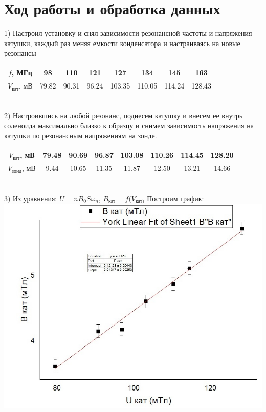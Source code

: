 \documentclass[%
reprint,
amsmath,amssymb,
aps,
]{revtex4-2}
\begin{document}
\section*{Ход работы и обработка данных}
1) Настроил установку и снял зависимости резонансной частоты и напряжения катушки, каждый раз меняя емкости конденсатора и настраиваясь на новые резонансы
\begin{table}[h]
\begin{tabular}{|c|c|c|c|c|c|c|c|}
\hline
$f$, МГц & 98 & 110 & 121 & 127 & 134 & 145 & 163 \\ \hline
$V_{\text{кат}}$, мВ & 79.82 & 90.31 & 96.24 & 103.35 & 110.05 & 114.24 & 128.43 \\ \hline
\end{tabular}
\centering
\end{table}\\
2) Настроившись на любой резонанс, поднесем катушку и внесем ее внутрь соленоида максимально близко к образцу и снимем зависимость напряжения на катушки по резонансным напряжениям на зонде.
\begin{table}[h]
\begin{tabular}{|c|c|c|c|c|c|c|c|}
$V_{\text{кат}}$, мВ & 79.48 & 90.69 & 96.87 & 103.08 & 110.26 & 114.45 & 128.20 \\ \hline
$V_{\text{зонд}}$, мВ & 9.44 & 10.65 & 11.35 & 11.87 & 12.50 & 13.21 & 14.66 \\ \hline
\end{tabular}
\centering
\end{table}\\
3) Из уравнения: $U = n B_0 S \omega_n$,
$B_{\text{кат}} =
f(V_{\text{кат})}$
Построим график:
\includegraphics[scale = 0.4]{one.jpg}
\centering
\end{document}
